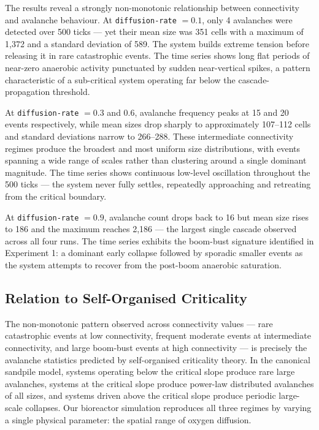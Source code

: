\documentclass[12pt]{article}
\begin{document}
The results reveal a strongly non-monotonic relationship between connectivity
and avalanche behaviour. At \texttt{diffusion-rate} $= 0.1$, only 4 avalanches
were detected over 500 ticks --- yet their mean size was 351 cells with a
maximum of 1,372 and a standard deviation of 589. The system builds extreme
tension before releasing it in rare catastrophic events. The time series shows
long flat periods of near-zero anaerobic activity punctuated by sudden
near-vertical spikes, a pattern characteristic of a sub-critical system
operating far below the cascade-propagation threshold.

At \texttt{diffusion-rate} $= 0.3$ and $0.6$, avalanche frequency peaks at 15
and 20 events respectively, while mean sizes drop sharply to approximately
107--112 cells and standard deviations narrow to 266--288. These intermediate
connectivity regimes produce the broadest and most uniform size distributions,
with events spanning a wide range of scales rather than clustering around a
single dominant magnitude. The time series shows continuous low-level
oscillation throughout the 500 ticks --- the system never fully settles,
repeatedly approaching and retreating from the critical boundary.

At \texttt{diffusion-rate} $= 0.9$, avalanche count drops back to 16 but mean
size rises to 186 and the maximum reaches 2,186 --- the largest single cascade
observed across all four runs. The time series exhibits the boom-bust signature
identified in Experiment 1: a dominant early collapse followed by sporadic
smaller events as the system attempts to recover from the post-boom anaerobic
saturation.

\subsection{Relation to Self-Organised Criticality}

The non-monotonic pattern observed across connectivity values --- rare
catastrophic events at low connectivity, frequent moderate events at
intermediate connectivity, and large boom-bust events at high connectivity ---
is precisely the avalanche statistics predicted by self-organised criticality
theory. In the canonical sandpile model, systems operating
below the critical slope produce rare large avalanches, systems at the critical
slope produce power-law distributed avalanches of all sizes, and systems driven
above the critical slope produce periodic large-scale collapses. Our bioreactor
simulation reproduces all three regimes by varying a single physical parameter:
the spatial range of oxygen diffusion.
\end{document}
